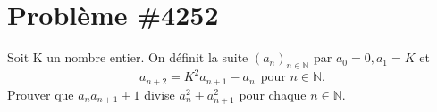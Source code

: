 \documentclass[12pt]{article}
\begin{document}
\section*{Problème \#4252}

Soit K un nombre entier. On définit la suite $(a_n)_{n \in \mathbb{N}}$ par $a_0 = 0, a_1 = K$ et
$$a_{n+2} = K^2a_{n+1}-a_n \ \ \text{pour } n \in \mathbb{N}.$$
Prouver que $a_n a_{n+1}+1$ divise $a_n^2+a_{n+1}^2$ pour chaque $ n \in \mathbb{N}.$ \\
\end{document}
